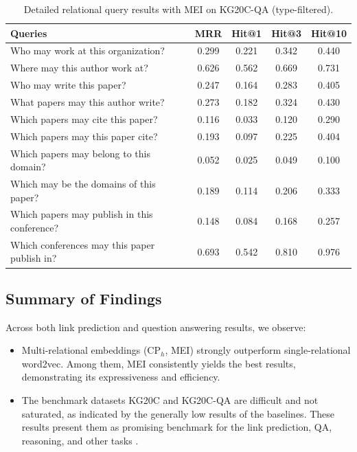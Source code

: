 \documentclass[conference]{IEEEtran}
\begin{document}
\begin{table}[htb]
	\small
	\centering
	\caption{Detailed relational query results with MEI on KG20C-QA (type-filtered).}
	\label{tab:result_kg20c_detail_intype}
	\begin{tabular}{lcccc}
		\toprule
		\textbf{Queries} & \textbf{MRR} & \textbf{Hit@1} & \textbf{Hit@3} & \textbf{Hit@10}\\ 
		\hline
		Who may work at this organization? & 0.299 & 0.221 & 0.342 & 0.440\\
		Where may this author work at? & 0.626 & 0.562 & 0.669 & 0.731\\
		Who may write this paper? & 0.247 & 0.164 & 0.283 & 0.405\\
		What papers may this author write? & 0.273 & 0.182 & 0.324 & 0.430\\
		Which papers may cite this paper? & 0.116 & 0.033 & 0.120 & 0.290\\
		Which papers may this paper cite? & 0.193 & 0.097 & 0.225 & 0.404\\
		Which papers may belong to this domain? & 0.052 & 0.025 & 0.049 & 0.100\\
		Which may be the domains of this paper? & 0.189 & 0.114 & 0.206 & 0.333\\
		Which papers may publish in this conference? & 0.148 & 0.084 & 0.168 & 0.257\\
		Which conferences may this paper publish in? & 0.693 & 0.542 & 0.810 & 0.976\\
		\bottomrule
	\end{tabular}
\end{table}

\subsection{Summary of Findings}

Across both link prediction and question answering results, we observe:
\begin{itemize}
	\item Multi-relational embeddings (CP$_h$, MEI) strongly outperform single-relational word2vec. Among them, MEI consistently yields the best results, demonstrating its expressiveness and efficiency. 
	\item The benchmark datasets KG20C and KG20C-QA are difficult and not saturated, as indicated by the generally low results of the baselines. These results present them as promising benchmark for the link prediction, QA, reasoning, and other tasks \cite{tran_analyzingknowledgegraph_2019, tran_exploringscholarlydata_2019, tran_encodingsearchingseparationperspective_2024}.
\end{itemize}
\end{document}
